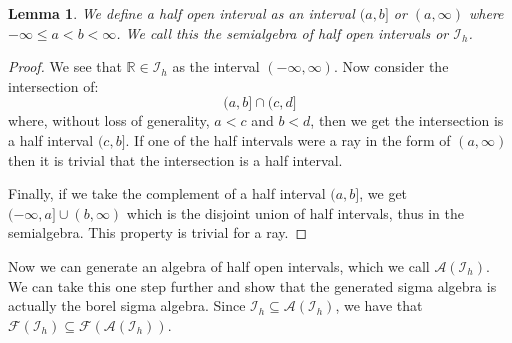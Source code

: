 \documentclass[10pt,letterpaper]{article} %
\newtheorem{lem}{Lemma}[section]
\begin{document}
\begin{lem}\label{Lemma 1.12}
We define a half open interval as an interval $(a, b]$ or $(a, \infty)$ where $-\infty \leqslant a < b < \infty$. We call this the semialgebra of half open intervals or $\mathcal{I}_h$.
\end{lem}
\begin{proof}
We see that $\mathbb{R} \in \mathcal{I}_h$ as the interval $(-\infty, \infty)$. Now consider the intersection of:
\begin{equation*}
(a, b] \cap (c, d]
\end{equation*}
where, without loss of generality, $a < c$ and $b < d$, then we get the intersection is a half interval $(c, b]$. If one of the half intervals were a ray in the form of $(a, \infty)$ then it is trivial that the intersection is a half interval.

Finally, if we take the complement of a half interval $(a, b]$, we get $(-\infty, a] \cup (b, \infty)$ which is the disjoint union of half intervals, thus in the semialgebra. This property is trivial for a ray.
\end{proof}

Now we can generate an algebra of half open intervals, which we call $\mathcal{A}(\mathcal{I}_h)$. We can take this one step further and show that the generated sigma algebra is actually the borel sigma algebra.
Since $\mathcal{I}_h \subseteq \mathcal{A}(\mathcal{I}_h)$, we have that $\mathcal{F}(\mathcal{I}_h) \subseteq \mathcal{F}(\mathcal{A}(\mathcal{I}_h))$. 
\end{document}
